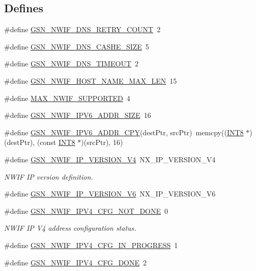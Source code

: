 \subsection*{Defines}
\begin{DoxyCompactItemize}
\item 
\#define \hyperlink{a00534_a96d191e78da08d8ea8ae4b6bfee9fb97}{GSN\_\-NWIF\_\-DNS\_\-RETRY\_\-COUNT}~2
\item 
\#define \hyperlink{a00534_af8b27c58acd985898926d6fe0b6cfb3e}{GSN\_\-NWIF\_\-DNS\_\-CASHE\_\-SIZE}~5
\item 
\#define \hyperlink{a00534_ae1cb9c1bbc2f81363b795c9ac1ea048f}{GSN\_\-NWIF\_\-DNS\_\-TIMEOUT}~2
\item 
\#define \hyperlink{a00534_adeccef71031ec2c93864f0fbb29198dd}{GSN\_\-NWIF\_\-HOST\_\-NAME\_\-MAX\_\-LEN}~15
\item 
\#define \hyperlink{a00534_a6debabbbdf43227c2cae9dd80f7fa657}{MAX\_\-NWIF\_\-SUPPORTED}~4
\item 
\#define \hyperlink{a00534_a59c19de5640e80b7ad4bbacc4b15ade1}{GSN\_\-NWIF\_\-IPV6\_\-ADDR\_\-SIZE}~16
\item 
\#define \hyperlink{a00534_a20193a95dac7e1e54cd39da9c97c6c20}{GSN\_\-NWIF\_\-IPV6\_\-ADDR\_\-CPY}(destPtr, srcPtr)~memcpy((\hyperlink{a00660_ga307b8734c020247f6bac4fcde0dcfbb9}{INT8} $\ast$)(destPtr), (const \hyperlink{a00660_ga307b8734c020247f6bac4fcde0dcfbb9}{INT8} $\ast$)(srcPtr), 16)
\item 
\#define \hyperlink{a00670_gab119822a51c7045db3244c577058c0ea}{GSN\_\-NWIF\_\-IP\_\-VERSION\_\-V4}~NX\_\-IP\_\-VERSION\_\-V4
\begin{DoxyCompactList}\small\item\em NWIF IP version definition. \end{DoxyCompactList}\item 
\#define \hyperlink{a00534_a3936013386aac5e27a3faf8871409de0}{GSN\_\-NWIF\_\-IP\_\-VERSION\_\-V6}~NX\_\-IP\_\-VERSION\_\-V6
\item 
\#define \hyperlink{a00670_ga300d647d9982a854748fe98d79ebd77b}{GSN\_\-NWIF\_\-IPV4\_\-CFG\_\-NOT\_\-DONE}~0
\begin{DoxyCompactList}\small\item\em NWIF IP V4 address configuration status. \end{DoxyCompactList}\item 
\#define \hyperlink{a00534_ad8d529addab1393539b7a7872f819321}{GSN\_\-NWIF\_\-IPV4\_\-CFG\_\-IN\_\-PROGRESS}~1
\item 
\#define \hyperlink{a00534_a377a3d06cfbffd5f1d8679005653a9ae}{GSN\_\-NWIF\_\-IPV4\_\-CFG\_\-DONE}~2

\end{DoxyCompactItemize}
